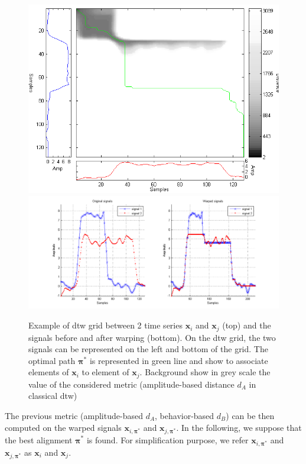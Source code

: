 \begin{figure}[h!]
	\centering
	\includegraphics[width=0.5\linewidth]{images/DTWgrid2}
	\includegraphics[width=0.9\linewidth]{images/DTWwarpedSignals}
	\caption{Example of {\sc dtw} grid between 2 time series $\textbf{x}_{i}$ and $\textbf{x}_{j}$ (top) and the signals before and after warping (bottom). On the {\sc dtw} grid, the two signals can be represented on the left and bottom of the grid. The optimal path $\boldsymbol{\pi}^*$ is represented in green line and show to associate elements of $\textbf{x}_{i}$ to element of $\textbf{x}_{j}$. Background show in grey scale the value of the considered metric (amplitude-based distance $d_A$ in classical {\sc dtw})}
	\label{fig:DTWgrid}
\end{figure}


The previous metric (amplitude-based $d_A$, behavior-based $d_B$) can be then computed on the warped signals $\textbf{x}_{i,\boldsymbol{\pi}^*}$ and $\textbf{x}_{j,\boldsymbol{\pi}^*}$. In the following, we suppose that the best alignment $\boldsymbol{\pi}^*$ is found. For simplification purpose, we refer $\textbf{x}_{i,\boldsymbol{\pi}^*}$ and $\textbf{x}_{j,\boldsymbol{\pi}^*}$ as $\textbf{x}_{i}$ and $\textbf{x}_{j}$. 


